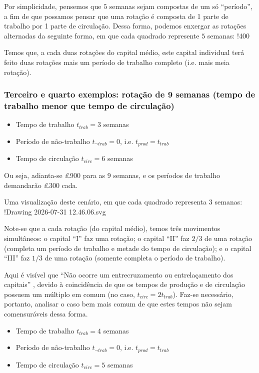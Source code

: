 Por simplicidade, pensemos que $5$ semanas sejam compostas de um só ``período'', a fim de que possamos pensar que uma rotação é composta de 1 parte de trabalho por 1 parte de circulação. Dessa forma, podemos enxergar as rotações alternadas da seguinte forma, em que cada quadrado represente $5$ semanas:
!400

Temos que, a cada duas rotações do capital médio, este capital individual terá feito duas rotações mais um período de trabalho completo (i.e. mais meia rotação). 

\subsubsection{Terceiro e quarto exemplos: rotação de 9 semanas (tempo de trabalho menor que tempo de circulação)}
\parencite[p. 371-3]{Marx2014}
\begin{itemize}
\item Tempo de trabalho $t_{trab}=3$ semanas
\item Período de não-trabalho $t_{\lnot trab}=0$, i.e. $t_{prod}=t_{trab}$
\item Tempo de circulação $t_{circ}=6$ semanas
\end{itemize}

Ou seja, adianta-se £900 para as 9 semanas, e os períodos de trabalho demandarão £300 cada.

Uma visualização deste cenário, em que cada quadrado representa $3$ semanas:
!Drawing 2026-07-31 12.46.06.svg

Note-se que a cada rotação (do capital médio), temos três movimentos simultâneos: o capital ``I'' faz uma rotação; o capital ``II'' faz $2/3$ de uma rotação (completa um período de trabalho e metade do tempo de circulação); e o capital ``III'' faz $1/3$ de uma rotação (somente completa o período de trabalho). 

Aqui é visível que ``Não ocorre um entrecruzamento ou entrelaçamento dos capitais'' \parencite[p. 373]{Marx2014}, devido à coincidência de que os tempos de produção e de circulação possuem um múltiplo em comum (no caso, $t_{circ}=2t_{trab}$). Faz-se necessário, portanto, analisar o caso bem mais comum de que estes tempos não sejam comensuráveis dessa forma.

\parencite[p. 373-6]{Marx2014}
\begin{itemize}
\item Tempo de trabalho $t_{trab}=4$ semanas
\item Período de não-trabalho $t_{\lnot trab}=0$, i.e. $t_{prod}=t_{trab}$
\item Tempo de circulação $t_{circ}=5$ semanas
\end{itemize}

